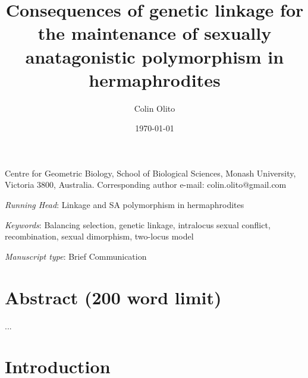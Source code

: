\documentclass{article}
\title{Consequences of genetic linkage for the maintenance of sexually anatagonistic polymorphism in hermaphrodites}
\author{Colin Olito}
\date{\today}
\begin{document}
\maketitle


\noindent{} Centre for Geometric Biology, School of Biological Sciences, Monash University, Victoria 3800, Australia.
\noindent{} Corresponding author e-mail: colin.olito@gmail.com

\bigskip

\noindent{} \textit{Running Head}: Linkage and SA polymorphism in hermaphrodites

\bigskip

\noindent{} \textit{Keywords}: Balancing selection, genetic linkage, intralocus sexual conflict, recombination, sexual dimorphism, two-locus model

\bigskip

\noindent{} \textit{Manuscript type}: Brief Communication

\bigskip


\linenumbers
\modulolinenumbers[1]
\renewcommand\linenumberfont{\normalfont\small}


\newpage{}
\section*{Abstract (200 word limit)}

\noindent{} ...

\newpage{}


\section*{Introduction}
\end{document}
